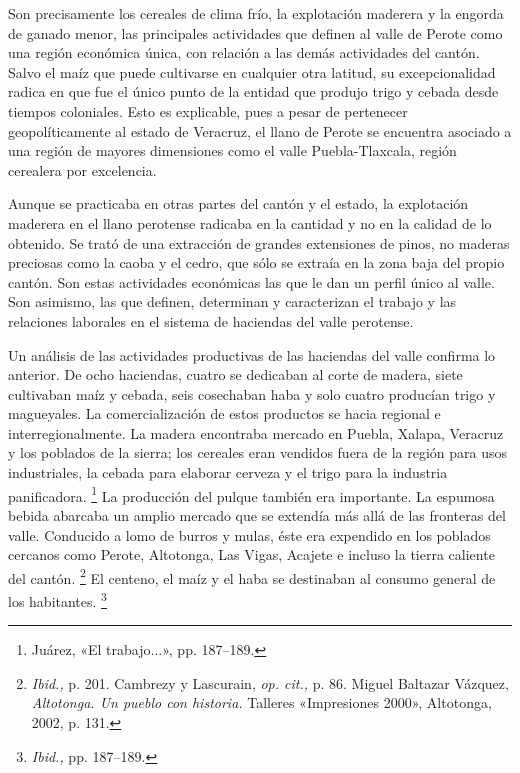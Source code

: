 \documentclass[14pt,twoside,final]{extbook} %
\let\oldfootnote\footnote
\renewcommand\footnote[1]{%
\oldfootnote{\hspace{1mm}#1}}
\begin{document}
Son precisamente los cereales de clima frío, la explotación maderera y la engorda de ganado menor, las principales actividades que definen al valle de Perote como una región económica única, con relación a las demás actividades del cantón. Salvo el maíz que puede cultivarse en cualquier otra latitud, su excepcionalidad radica en que fue el único punto de la entidad que produjo trigo y cebada desde tiempos coloniales. Esto es explicable, pues a pesar de pertenecer geopolíticamente al estado de Veracruz, el llano de Perote se encuentra asociado a una región de mayores dimensiones como el valle Puebla-Tlaxcala, región cerealera por excelencia.

Aunque se practicaba en otras partes del cantón y el estado, la explotación maderera en el llano perotense radicaba en la cantidad y no en la calidad de lo obtenido. Se trató de una extracción de grandes extensiones de pinos, no maderas preciosas como la caoba y el cedro, que sólo se extraía en la zona baja del propio cantón. Son estas actividades económicas las que le dan un perfil único al valle. Son asimismo, las que definen, determinan y caracterizan el trabajo y las relaciones laborales en el sistema de haciendas del valle perotense.

Un análisis de las actividades productivas de las haciendas del valle confirma lo anterior. De ocho haciendas, cuatro se dedicaban al corte de madera, siete cultivaban maíz y cebada, seis cosechaban haba y solo cuatro producían trigo y magueyales. La comercialización de estos productos se hacia regional e interregionalmente. La madera encontraba mercado en Puebla, Xalapa, Veracruz y los poblados de la sierra; los cereales eran vendidos fuera de la región para usos industriales, la cebada para elaborar cerveza y el trigo para la industria panificadora.\footnote{Juárez, «El trabajo...», pp. 187--189.} La producción del pulque también era importante. La espumosa bebida abarcaba un amplio mercado que se extendía más allá de las fronteras del valle. Conducido a lomo de burros y mulas, éste era expendido en los poblados cercanos como Perote, Altotonga, Las Vigas, Acajete e incluso la tierra caliente del cantón.\footnote{\emph{Ibid.,} p. 201. Cambrezy y Lascurain, \emph{op. cit.,} p. 86. Miguel Baltazar Vázquez, \emph{Altotonga. Un pueblo con historia.} Talleres «Impresiones 2000», Altotonga, 2002, p. 131.} El centeno, el maíz y el haba se destinaban al consumo general de los habitantes.\footnote{\emph{Ibid.,} pp. 187--189.}
\end{document}
